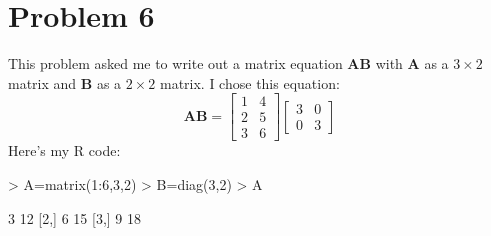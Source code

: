 \documentclass{article}
\begin{document}
\section*{Problem 6}

This problem asked me to write out a matrix equation $\mathbf{A}\mathbf{B}$ with $\mathbf{A}$ as a $3 \times 2$ matrix and $\mathbf{B}$ as a $2 \times 2$ matrix.  I chose this equation:
$$
\mathbf{A}\mathbf{B}=
\begin{bmatrix} 1 & 4\\ 2 & 5 \\ 3 & 6\end{bmatrix}
\begin{bmatrix} 3 & 0 \\ 0 & 3 \end{bmatrix}
$$
Here's my R code:

\begin{Schunk}
\begin{Sinput}
> A=matrix(1:6,3,2)
> B=diag(3,2)
> A%
\end{Sinput}
\begin{Soutput}
     [,1] [,2]
[1,]    3   12
[2,]    6   15
[3,]    9   18
\end{Soutput}
\end{Schunk}
\end{document}
